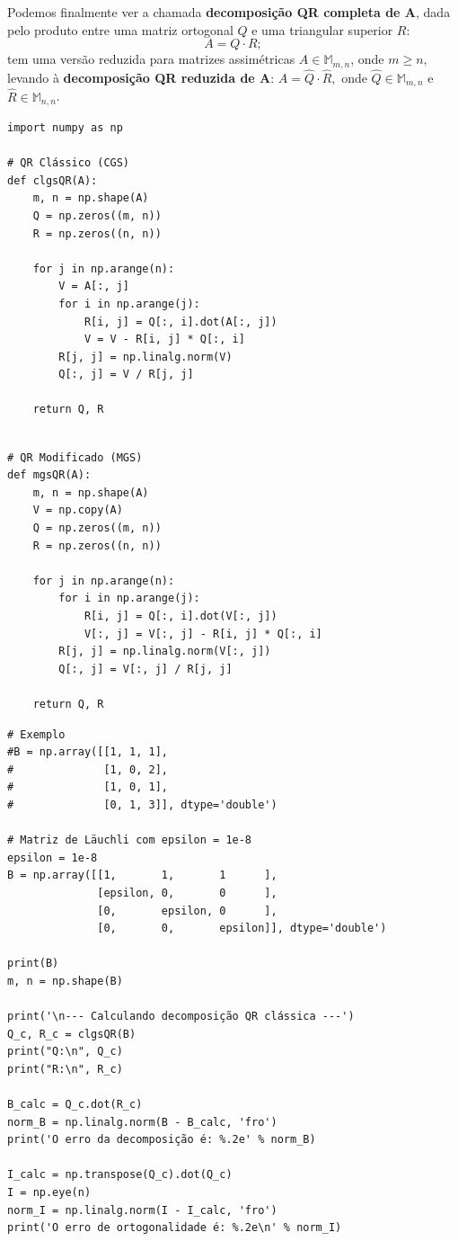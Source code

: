 \documentclass[../numerical_methods.tex]{subfiles}
\begin{document}
Podemos finalmente ver a chamada \textbf{decomposição QR completa de A}, dada pelo produto entre uma matriz ortogonal \(Q\) e uma triangular superior \(R\):
\[
	A = Q \cdot R;
\]
tem uma versão reduzida para matrizes assimétricas \(A\in \mathbb{M}_{m, n}\), onde \(m\geq n\), levando à \textbf{decomposição QR reduzida de A}: \(A = \hat{Q} \cdot \hat{R},\) onde \(\hat{Q}\in \mathbb{M}_{m, n}\) e \(\hat{R}\in \mathbb{M}_{n, n}\).
\begin{listing}[H]
	\caption{Método QR Clássico e Modificado}
	\begin{verbatim}
import numpy as np

# QR Clássico (CGS)
def clgsQR(A):
    m, n = np.shape(A)
    Q = np.zeros((m, n))
    R = np.zeros((n, n))

    for j in np.arange(n):
        V = A[:, j]
        for i in np.arange(j):
            R[i, j] = Q[:, i].dot(A[:, j])
            V = V - R[i, j] * Q[:, i]
        R[j, j] = np.linalg.norm(V)
        Q[:, j] = V / R[j, j]

    return Q, R
  \end{verbatim}
	\begin{verbatim}

# QR Modificado (MGS)
def mgsQR(A):
    m, n = np.shape(A)
    V = np.copy(A)
    Q = np.zeros((m, n))
    R = np.zeros((n, n))

    for j in np.arange(n):
        for i in np.arange(j):
            R[i, j] = Q[:, i].dot(V[:, j])
            V[:, j] = V[:, j] - R[i, j] * Q[:, i]
        R[j, j] = np.linalg.norm(V[:, j])
        Q[:, j] = V[:, j] / R[j, j]

    return Q, R

  \end{verbatim}
\end{listing}
\begin{listing}[H]
	\begin{verbatim}
# Exemplo
#B = np.array([[1, 1, 1],
#              [1, 0, 2],
#              [1, 0, 1],
#              [0, 1, 3]], dtype='double')

# Matriz de Läuchli com epsilon = 1e-8
epsilon = 1e-8
B = np.array([[1,       1,       1      ],
              [epsilon, 0,       0      ],
              [0,       epsilon, 0      ],
              [0,       0,       epsilon]], dtype='double')

print(B)
m, n = np.shape(B)

print('\n--- Calculando decomposição QR clássica ---')
Q_c, R_c = clgsQR(B)
print("Q:\n", Q_c)
print("R:\n", R_c)

B_calc = Q_c.dot(R_c)
norm_B = np.linalg.norm(B - B_calc, 'fro')
print('O erro da decomposição é: %.2e' % norm_B)

I_calc = np.transpose(Q_c).dot(Q_c)
I = np.eye(n)
norm_I = np.linalg.norm(I - I_calc, 'fro')
print('O erro de ortogonalidade é: %.2e\n' % norm_I)

  \end{verbatim}
\end{listing}
\end{document}
